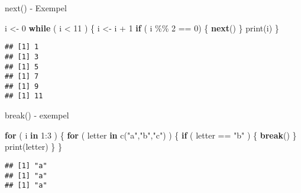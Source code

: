 \documentclass[
  11pt,
  ignorenonframetext,
]{beamer}
\newenvironment{Shaded}{\begin{snugshade}}{\end{snugshade}}
\newcommand{\ControlFlowTok}[1]{\textcolor[rgb]{0.13,0.29,0.53}{\textbf{#1}}}
\newcommand{\DecValTok}[1]{\textcolor[rgb]{0.00,0.00,0.81}{#1}}
\newcommand{\FunctionTok}[1]{\textcolor[rgb]{0.00,0.00,0.00}{#1}}
\newcommand{\NormalTok}[1]{#1}
\newcommand{\OtherTok}[1]{\textcolor[rgb]{0.56,0.35,0.01}{#1}}
\newcommand{\SpecialCharTok}[1]{\textcolor[rgb]{0.00,0.00,0.00}{#1}}
\newcommand{\StringTok}[1]{\textcolor[rgb]{0.31,0.60,0.02}{#1}}
\begin{document}
\begin{frame}[fragile]{next() - Exempel}
\protect\hypertarget{next---exempel}{}
\begin{Shaded}
\begin{Highlighting}[]
\NormalTok{i }\OtherTok{\textless{}{-}} \DecValTok{0}
\ControlFlowTok{while}\NormalTok{ ( i }\SpecialCharTok{\textless{}} \DecValTok{11}\NormalTok{ ) \{}
\NormalTok{  i }\OtherTok{\textless{}{-}}\NormalTok{ i }\SpecialCharTok{+} \DecValTok{1}
  \ControlFlowTok{if}\NormalTok{ ( i }\SpecialCharTok{\%\%} \DecValTok{2} \SpecialCharTok{==} \DecValTok{0}\NormalTok{) \{ }\ControlFlowTok{next}\NormalTok{() \}}
  \FunctionTok{print}\NormalTok{(i)}
\NormalTok{\}}
\end{Highlighting}
\end{Shaded}

\pause

\begin{verbatim}
## [1] 1
## [1] 3
## [1] 5
## [1] 7
## [1] 9
## [1] 11
\end{verbatim}
\end{frame}


\begin{frame}[fragile]{break() - exempel}
\protect\hypertarget{break---exempel}{}
\begin{Shaded}
\begin{Highlighting}[]
\ControlFlowTok{for}\NormalTok{ ( i }\ControlFlowTok{in} \DecValTok{1}\SpecialCharTok{:}\DecValTok{3}\NormalTok{ ) \{}
  \ControlFlowTok{for}\NormalTok{ ( letter }\ControlFlowTok{in} \FunctionTok{c}\NormalTok{(}\StringTok{"a"}\NormalTok{,}\StringTok{"b"}\NormalTok{,}\StringTok{"c"}\NormalTok{) ) \{}
    \ControlFlowTok{if}\NormalTok{ ( letter }\SpecialCharTok{==} \StringTok{"b"}\NormalTok{ ) \{ }\ControlFlowTok{break}\NormalTok{() \}}
    \FunctionTok{print}\NormalTok{(letter)}
\NormalTok{  \}}
\NormalTok{\}}
\end{Highlighting}
\end{Shaded}

\pause

\begin{verbatim}
## [1] "a"
## [1] "a"
## [1] "a"
\end{verbatim}
\end{frame}

\end{document}
